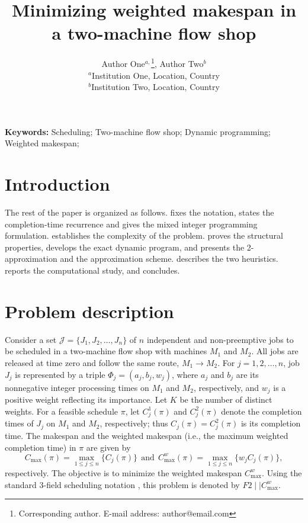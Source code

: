 \documentclass[12pt]{article}
\title{\LARGE\bf Minimizing weighted makespan in a two-machine flow shop}
\author{Author One$^{a,}$\footnote{Corresponding author. E-mail address: author@email.com}, Author Two$^{b}$\\
    {\small $^{a}$Institution One, Location, Country}\\
    {\small $^{b}$Institution Two, Location, Country}\\}
\date{}
\let\origsection\section
\renewcommand{\section}{\FloatBarrier\origsection}
\begin{document}
    \begin{sloppypar}
        
        \maketitle
        
        \begin{abstract}
            
        \end{abstract}
        
        \noindent \textbf{Keywords:} Scheduling; Two-machine flow shop; Dynamic programming; Weighted makespan; 
        
        \section{Introduction} \label{sec:intro}
        
        
        
        The rest of the paper is organized as follows.  fixes
        the notation, states the completion-time recurrence and gives the mixed integer programming
        formulation.  establishes the complexity of the problem.  proves the
        structural properties, develops the exact dynamic program, and presents the
        2-approximation and the approximation scheme.  describes
        the two heuristics.  reports the computational study,
        and  concludes.
        
        \section{Problem description}    \label{sec:preliminaries}
        
        Consider a set $\mathcal{J} = \{J_1, J_2, \dots, J_n\}$ of $n$ independent and non-preemptive jobs to be scheduled in a two-machine flow shop with machines $M_1$ and $M_2$. All jobs are released at time zero and follow the same route, $M_1 \to M_2$. For $j=1, 2, \ldots, n$, job $J_j$ is represented by a triple $\Phi_j=(a_j, b_j, w_j)$, where $a_j$ and $b_j$ are its nonnegative integer processing times on $M_1$ and $M_2$, respectively, and $w_j$ is a positive weight reflecting its importance. Let $K$ be the number of distinct weights. For a feasible schedule $\pi$, let $C_j^1(\pi)$ and $C_j^2(\pi)$ denote the completion times of $J_j$ on $M_1$ and $M_2$, respectively; thus $C_j(\pi)=C_j^2(\pi)$ is its completion time. The makespan and the weighted makespan (i.e., the maximum weighted completion time) in $\pi$ are given by 
        \begin{equation*}
            C_{\max}(\pi)=\max_{1 \leq j \leq n} \{C_j(\pi)\} ~~ \mathrm{and} ~~ C_{\max}^w(\pi)=\max_{1 \leq j \leq n} \{w_j C_j(\pi)\},
        \end{equation*} 
        respectively. The objective is to minimize the weighted makespan $C_{\max}^w$. Using the standard 3-field scheduling notation \citep{Pinedo2022scheduling}, this problem is denoted by $F2 \mid \mid C_{\max}^w$.
        

\end{sloppypar}
\end{document}
